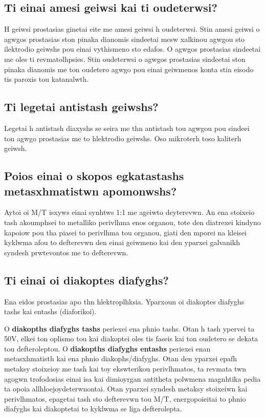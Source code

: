 \documentclass{article}
\begin{document}
\subsection{Ti einai amesi geiwsi kai ti oudeterwsi?}
H geiwsi prostasias ginetai eite me amesi geiwsi h oudeterwsi. Stin amesi geiwsi o agwgos prostasias ston pinaka dianomis sindeetai mesw xalkinou agwgou sto ilektrodio geiwshs pou einai vythismeno sto edafos.  O agwgos prostasias sindeetai me oles ti revmatolhpsies. Stin oudeterwsi o agwgos prostasias sindeetai ston pinaka dianomis me ton oudetero agwgo pou einai geiwmenos konta stin eisodo tis paroxis tou katanalwth.

\subsection{Ti legetai antistash geiwshs?}
Legetai h antistash diaxyshs se seira me thn antistash tou agwgou pou sindeei ton agwgo prostasias me to hlektrodio geiwshs. Oso mikroterh toso kaliterh geiwsh.

\subsection{Poios einai o skopos egkatastashs metasxhmatistwn apomonwshs?}
Aytoi oi M/T isxyws einai synhtws 1:1 me ageiwto deyterevwn. An ena stoixeio tash akoumphsei to metalliko perivlhma enos organou, tote den diatrexei kindyno kapoiow pou tha piasei to perivlhma tou organou, giati den mporei na kleisei kyklwma afou to defterevwn den einai geiwmeno kai den yparxei galvanikh syndesh prwtevontos me to defterevwn.

\subsection{Ti einai oi diakoptes diafyghs?}
Ena eidos prostasias apo thn hlektroplhksia. Yparxoun oi diakoptes diafyghs tashs kai entashs (diaforikoi). 

O \textbf{diakopths diafyghs tashs} periexei ena phnio tashs. Otan h tash ypervei ta 50V, elkei ton oplismo tou kai diakoptei oles tis faseis kai ton oudetero se dekata tou defteroleptou.
O \textbf{diakopths diafyghs entashs} periexei enan metasxhmatisth kai ena phnio diakophs/diafyghs. Otan den yparxei epafh metaksy stoixeioy me tash kai toy ekswterikou perivlhmatos, ta revmata twn agogwn trofodosias einai isa kai dimioyrgan antitheta polwmena magnhtika pedia ta opoia allhloejoydeterwnontai. Otan yparxei syndesh metaksy stoixeiwn kai perivlhmatos, epagetai tash sto defterevwn tou M/T, energopoieitai to phnio diafyghs kai diakoptetai to kyklwma se liga defterolepta.
\end{document}
